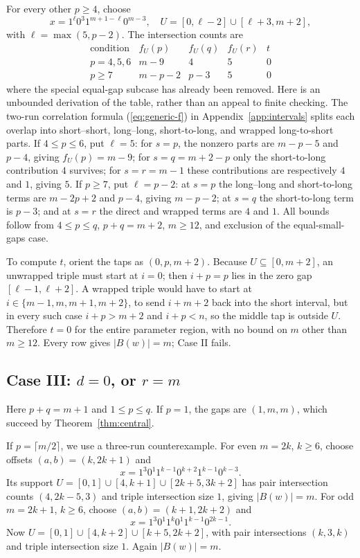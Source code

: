 \documentclass[11pt,a4paper]{article}
\newcommand{\wt}[1]{\lvert #1\rvert}
\begin{document}
For every other $p\ge4$, choose
\begin{equation}\label{eq:generic}
 x=1^\ell 0^3 1^{m+1-\ell}0^{m-3},\quad U=[0,\ell-2]\cup[\ell+3,m+2],
\end{equation}
with $\ell=\max(5,p-2)$. The intersection counts are
\begin{equation}\label{eq:caseII-tab}
\begin{array}{c|cccc}
\text{condition}&f_U(p)&f_U(q)&f_U(r)&t\\\hline
p=4,5,6&m-9&4&5&0\\
p\ge7&m-p-2&p-3&5&0
\end{array}
\end{equation}
where the special equal-gap subcase has already been removed. Here is an unbounded derivation of the table, rather than an appeal to finite checking. The two-run correlation formula (\ref{eq:generic-f}) in Appendix~\ref{app:intervals} splits each overlap into short--short, long--long, short-to-long, and wrapped long-to-short parts. If $4\le p\le6$, put $\ell=5$: for $s=p$, the nonzero parts are $m-p-5$ and $p-4$, giving $f_U(p)=m-9$; for $s=q=m+2-p$ only the short-to-long contribution $4$ survives; for $s=r=m-1$ these contributions are respectively $4$ and $1$, giving $5$. If $p\ge7$, put $\ell=p-2$: at $s=p$ the long--long and short-to-long terms are $m-2p+2$ and $p-4$, giving $m-p-2$; at $s=q$ the short-to-long term is $p-3$; and at $s=r$ the direct and wrapped terms are $4$ and $1$. All bounds follow from $4\le p\le q$, $p+q=m+2$, $m\ge12$, and exclusion of the equal-small-gaps case.

To compute $t$, orient the taps as $(0,p,m+2)$. Because $U\subseteq[0,m+2]$, an unwrapped triple must start at $i=0$; then $i+p=p$ lies in the zero gap $[\ell-1,\ell+2]$. A wrapped triple would have to start at $i\in\{m-1,m,m+1,m+2\}$, to send $i+m+2$ back into the short interval, but in every such case $i+p>m+2$ and $i+p<n$, so the middle tap is outside $U$. Therefore $t=0$ for the entire parameter region, with no bound on $m$ other than $m\ge12$. Every row gives $\wt{B(w)}=m$; Case II fails.

\subsection{Case III: $d=0$, or $r=m$}
Here $p+q=m+1$ and $1\le p\le q$. If $p=1$, the gaps are $(1,m,m)$, which succeed by Theorem~\ref{thm:central}.

If $p=\lceil m/2\rceil$, we use a three-run counterexample. For even $m=2k$, $k\ge6$, choose offsets $(a,b)=(k,2k+1)$ and
\begin{equation}\label{eq:B-even}
 x=1^3 0^1 1^{k-1}0^{k+2}1^{k-1}0^{k-3}.
\end{equation}
Its support $U=[0,1]\cup[4,k+1]\cup[2k+5,3k+2]$ has pair intersection counts $(4,2k-5,3)$ and triple intersection size $1$, giving $\wt{B(w)}=m$. For odd $m=2k+1$, $k\ge6$, choose $(a,b)=(k+1,2k+2)$ and
\begin{equation}\label{eq:B-odd}
 x=1^3 0^1 1^k0^1 1^{k-1}0^{2k-1}.
\end{equation}
Now $U=[0,1]\cup[4,k+2]\cup[k+5,2k+2]$, with pair intersections $(k,3,k)$ and triple intersection size $1$. Again $\wt{B(w)}=m$.
\end{document}
